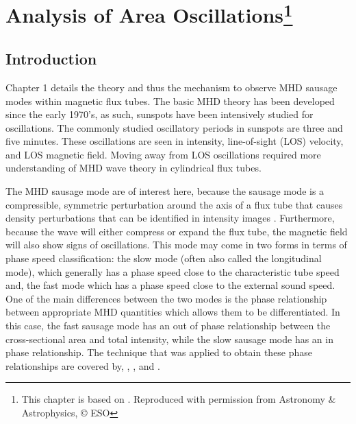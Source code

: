 \graphicspath{{Chapter3/Figs/}}
\nobibliography*

\chapter[Analysis of Area Oscillations]{Analysis of Area Oscillations\footnote{This chapter is based on . Reproduced with permission from Astronomy \& Astrophysics, © ESO}}
\label{chapter3}

   \vspace*{\fill}\par
   \pagebreak

\section{Introduction}

	Chapter 1 details the theory and thus the mechanism to observe MHD sausage modes within magnetic flux tubes. 
	The basic MHD theory has been developed since the early 1970's, as such, sunspots have been intensively studied for oscillations. 
	The commonly studied oscillatory periods in sunspots are three and five minutes.
	These oscillations are seen in intensity, line-of-sight (LOS) velocity, and LOS magnetic field.
	Moving away from LOS oscillations required more understanding of MHD wave theory in cylindrical flux tubes. 

	The MHD sausage mode are of interest here, because the sausage mode is a compressible, symmetric perturbation around the axis of a flux tube that causes density perturbations that can be identified in intensity images \citep{PMHDW}.
	Furthermore, because the wave will either compress or expand the flux tube, the magnetic field will also show signs of oscillations.
	This mode may come in two forms in terms of phase speed classification: the slow mode (often also called the longitudinal mode), which generally has a phase speed close to the characteristic tube speed and, the fast mode which has a phase speed close to the external sound speed.
	One of the main differences between the two modes is the phase relationship between appropriate MHD quantities which allows them to be differentiated.
	In this case, the fast sausage mode has an out of phase relationship between the cross-sectional area and total intensity, while the slow sausage mode has an in phase relationship.
	The technique that was applied to obtain these phase relationships are covered by, \cite{PMHDW}, \cite{Moreels2013}, and \cite{Moreels2013b}.

